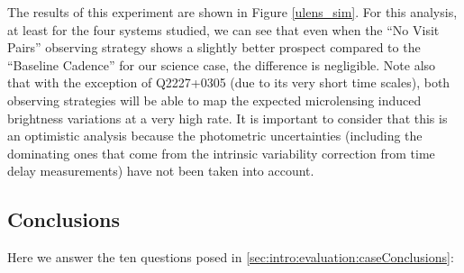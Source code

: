 The results of this experiment are shown in Figure \ref{ulens_sim}. For this analysis, at least for the four systems studied, we can see that even when the ``No Visit Pairs'' observing strategy shows a slightly better prospect compared to the ``Baseline Cadence'' for our science case, the difference is negligible. Note also that with the exception of Q2227+0305 (due to its very short time scales), both observing strategies will be able to map the expected microlensing induced brightness variations at a very high rate. It is important to consider that this is an optimistic analysis because the photometric uncertainties (including the dominating ones that come from the intrinsic variability correction from time delay measurements) have not been taken into account.


\subsection{Conclusions}
\label{sec:\secname:questions}

Here we answer the ten questions posed in
\autoref{sec:intro:evaluation:caseConclusions}:

